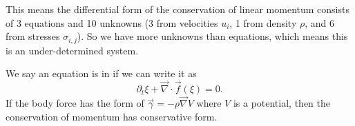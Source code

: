 \begin{remark}
This means the differential form of the conservation of linear
momentum consists of 3 equations and 10 unknowns (3 from velocities
$u_{i}$, 1 from density $\rho$, and 6 from stresses $\sigma_{i,j}$).
So we have more unknowns than equations, which means this is an
under-determined system.
\end{remark}

\begin{definition}
We say an equation is in  if we can write it as
\begin{equation}
\partial_{t}\xi + \vec{\nabla}\cdot\vec{f}(\xi)=0.
\end{equation}
If the body force has the form of $\vec{\gamma}=-\rho\vec{\nabla}V$
where $V$ is a potential, then the conservation of momentum has
conservative form.
\end{definition}